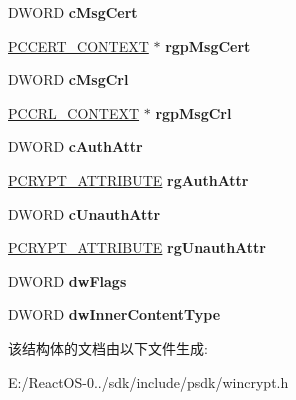 \begin{DoxyCompactItemize}
D\+W\+O\+RD {\bfseries c\+Msg\+Cert}
\item 
\mbox{\label{struct___c_r_y_p_t___s_i_g_n___m_e_s_s_a_g_e___p_a_r_a_a1786181e4ceffaaf4e53e525cd8982a8}} 
\hyperlink{struct___c_e_r_t___c_o_n_t_e_x_t}{P\+C\+C\+E\+R\+T\+\_\+\+C\+O\+N\+T\+E\+XT} $\ast$ {\bfseries rgp\+Msg\+Cert}
\item 
\mbox{\label{struct___c_r_y_p_t___s_i_g_n___m_e_s_s_a_g_e___p_a_r_a_a2770bf0cd0d4197404c4d0a4dc33eb76}} 
D\+W\+O\+RD {\bfseries c\+Msg\+Crl}
\item 
\mbox{\label{struct___c_r_y_p_t___s_i_g_n___m_e_s_s_a_g_e___p_a_r_a_af865a73a05dc18af2229cc488700ffad}} 
\hyperlink{struct___c_r_l___c_o_n_t_e_x_t}{P\+C\+C\+R\+L\+\_\+\+C\+O\+N\+T\+E\+XT} $\ast$ {\bfseries rgp\+Msg\+Crl}
\item 
\mbox{\label{struct___c_r_y_p_t___s_i_g_n___m_e_s_s_a_g_e___p_a_r_a_a6de959410ab1e36ef26b6b8ddbbe5ff5}} 
D\+W\+O\+RD {\bfseries c\+Auth\+Attr}
\item 
\mbox{\label{struct___c_r_y_p_t___s_i_g_n___m_e_s_s_a_g_e___p_a_r_a_ae978daed12be2136812b3c9010e453f1}} 
\hyperlink{struct___c_r_y_p_t___a_t_t_r_i_b_u_t_e}{P\+C\+R\+Y\+P\+T\+\_\+\+A\+T\+T\+R\+I\+B\+U\+TE} {\bfseries rg\+Auth\+Attr}
\item 
\mbox{\label{struct___c_r_y_p_t___s_i_g_n___m_e_s_s_a_g_e___p_a_r_a_a26b42865eb3b88f1b5be2df2dcf48bd2}} 
D\+W\+O\+RD {\bfseries c\+Unauth\+Attr}
\item 
\mbox{\label{struct___c_r_y_p_t___s_i_g_n___m_e_s_s_a_g_e___p_a_r_a_a503b4fa5c8ee0b79f4a0f3a707f5ca48}} 
\hyperlink{struct___c_r_y_p_t___a_t_t_r_i_b_u_t_e}{P\+C\+R\+Y\+P\+T\+\_\+\+A\+T\+T\+R\+I\+B\+U\+TE} {\bfseries rg\+Unauth\+Attr}
\item 
\mbox{\label{struct___c_r_y_p_t___s_i_g_n___m_e_s_s_a_g_e___p_a_r_a_a24a61f22924cd0f6886074c51ea5b575}} 
D\+W\+O\+RD {\bfseries dw\+Flags}
\item 
\mbox{\label{struct___c_r_y_p_t___s_i_g_n___m_e_s_s_a_g_e___p_a_r_a_ab51cb7c4a76333382a5663918b2d7428}} 
D\+W\+O\+RD {\bfseries dw\+Inner\+Content\+Type}
\end{DoxyCompactItemize}


该结构体的文档由以下文件生成\+:\begin{DoxyCompactItemize}
\item 
E\+:/\+React\+O\+S-\/0../sdk/include/psdk/wincrypt.\+h\end{DoxyCompactItemize}
